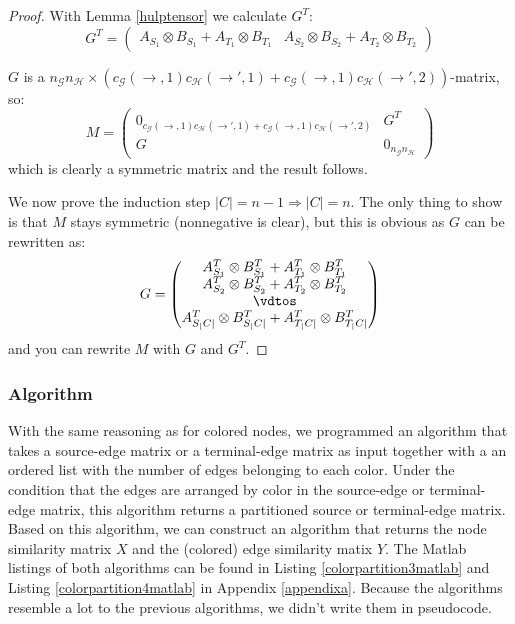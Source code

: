 \documentclass[a4paper,11pt]{report}
\newcommand{\graf}{\mathscr{G}}
\newcommand{\grafeen}{\mathscr{H}}
\begin{document}
\begin{proof}
With Lemma \ref{hulptensor} we calculate $G^T$:
$$G^T = \begin{pmatrix}
A_{S_1} \otimes  B_{S_1} + A_{T_1} \otimes B_{T_1} &
A_{S_2} \otimes  B_{S_2} + A_{T_2} \otimes B_{T_2}
\end{pmatrix}$$

$G$ is a $n_\graf n_\grafeen \times (c_\graf(\to,1)c_\grafeen(\to',1)+c_\graf(\to,1)c_\grafeen(\to',2))$-matrix, so:
$$ M = \begin{pmatrix}
0_{c_\graf(\to,1)c_\grafeen(\to',1)+c_\graf(\to,1)c_\grafeen(\to',2)}& G^T\\
G & 0_{n_\graf n_\grafeen}
\end{pmatrix}$$
which is clearly a symmetric matrix and the result follows.

We now prove the induction step $|C|=n-1 \Rightarrow |C|=n$. The only thing to 
show is that $M$ stays symmetric (nonnegative is clear), but this is obvious as $G$ can be rewritten 
as:
$$G = \begin{pmatrix}
A^T_{S_1} \otimes  B^T_{S_1} + A^T_{T_1} \otimes B^T_{T_1}\\
A^T_{S_2} \otimes  B^T_{S_2} + A^T_{T_2} \otimes B^T_{T_2}\\
\vdtos\\
A^T_{S_|C|} \otimes  B^T_{S_|C|} + A^T_{T_|C|} \otimes B^T_{T_|C|}
\end{pmatrix}$$
and you can rewrite $M$ with $G$ and $G^T$.



\end{proof}
\subsubsection{Algorithm}
With the same reasoning as for colored nodes, we programmed an algorithm that 
takes a source-edge matrix or a terminal-edge matrix as input together with a 
an ordered list with the number of edges belonging to each color. Under the 
condition that the edges are arranged by color in the source-edge or 
terminal-edge matrix, this algorithm returns a partitioned source or terminal-edge 
matrix. Based on this algorithm, we can construct an algorithm that returns the 
node similarity matrix $X$ and the (colored) edge similarity matix $Y$. The 
Matlab
listings of both algorithms can be found in Listing \ref{colorpartition3matlab} 
and Listing \ref{colorpartition4matlab} in Appendix \ref{appendixa}. Because the 
algorithms resemble a lot to the previous algorithms, we didn't write them in 
pseudocode.
\end{document}
